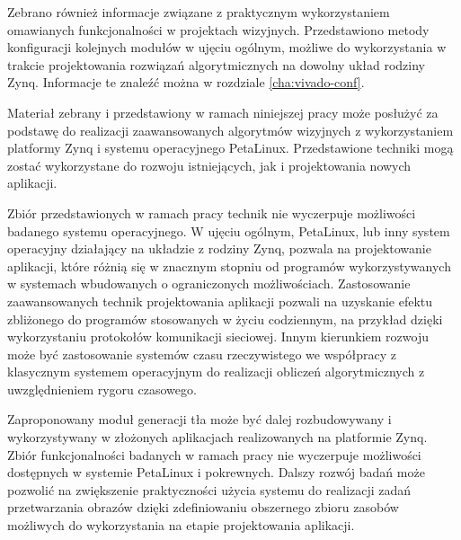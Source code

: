Zebrano również informacje związane z praktycznym wykorzystaniem omawianych funkcjonalności w projektach wizyjnych. 
Przedstawiono metody konfiguracji kolejnych modułów w ujęciu ogólnym, możliwe do wykorzystania w trakcie projektowania rozwiązań algorytmicznych na dowolny układ rodziny Zynq. 
Informacje te znaleźć można w rozdziale \ref{cha:vivado-conf}.

Materiał zebrany i przedstawiony w ramach niniejszej pracy może posłużyć za podstawę do realizacji zaawansowanych algorytmów wizyjnych z wykorzystaniem platformy Zynq i systemu operacyjnego PetaLinux. 
Przedstawione techniki mogą zostać wykorzystane do rozwoju istniejących, jak i projektowania nowych aplikacji.

Zbiór przedstawionych w ramach pracy technik nie wyczerpuje możliwości badanego systemu operacyjnego. 
W ujęciu ogólnym, PetaLinux, lub inny system operacyjny działający na układzie z rodziny Zynq, pozwala na projektowanie aplikacji, które różnią się w znacznym stopniu od programów wykorzystywanych w systemach wbudowanych o ograniczonych możliwościach. 
Zastosowanie zaawansowanych technik projektowania aplikacji pozwali na uzyskanie efektu zbliżonego do programów stosowanych w życiu codziennym, na przykład dzięki wykorzystaniu protokołów komunikacji sieciowej.
Innym kierunkiem rozwoju może być zastosowanie systemów czasu rzeczywistego we współpracy z klasycznym systemem operacyjnym do realizacji obliczeń algorytmicznych z uwzględnieniem rygoru czasowego.

Zaproponowany moduł generacji tła może być dalej rozbudowywany i wykorzystywany w złożonych aplikacjach realizowanych na platformie Zynq.
Zbiór funkcjonalności badanych w ramach pracy nie wyczerpuje możliwości dostępnych w systemie PetaLinux i pokrewnych. Dalszy rozwój badań może pozwolić na zwiększenie praktyczności użycia systemu do realizacji zadań przetwarzania obrazów dzięki zdefiniowaniu obszernego zbioru zasobów możliwych do wykorzystania na etapie projektowania aplikacji.


